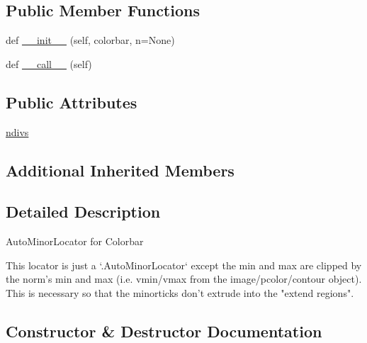 \subsection*{Public Member Functions}
\begin{DoxyCompactItemize}
\item 
def \hyperlink{classmatplotlib_1_1colorbar_1_1__ColorbarAutoMinorLocator_a13a95b32492b290ad60ebb2927ca9339}{\+\_\+\+\_\+init\+\_\+\+\_\+} (self, colorbar, n=None)
\item 
def \hyperlink{classmatplotlib_1_1colorbar_1_1__ColorbarAutoMinorLocator_a7c1e07bc69ca535e96cadf9cacc93ac7}{\+\_\+\+\_\+call\+\_\+\+\_\+} (self)
\end{DoxyCompactItemize}
\subsection*{Public Attributes}
\begin{DoxyCompactItemize}
\item 
\hyperlink{classmatplotlib_1_1colorbar_1_1__ColorbarAutoMinorLocator_a690dda71f83841586782314b8643fe45}{ndivs}
\end{DoxyCompactItemize}
\subsection*{Additional Inherited Members}


\subsection{Detailed Description}
\begin{DoxyVerb}AutoMinorLocator for Colorbar

This locator is just a `.AutoMinorLocator` except the min and max are
clipped by the norm's min and max (i.e. vmin/vmax from the
image/pcolor/contour object).  This is necessary so that the minorticks
don't extrude into the "extend regions".
\end{DoxyVerb}
 

\subsection{Constructor \& Destructor Documentation}
\mbox{\label{classmatplotlib_1_1colorbar_1_1__ColorbarAutoMinorLocator_a13a95b32492b290ad60ebb2927ca9339}} 
